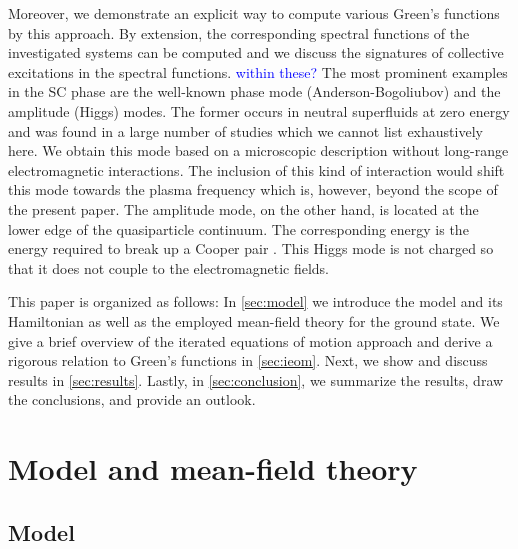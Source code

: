 \documentclass[
    reprint, 
    aps,
    preprintnumbers,
    twocolumn,
    prb,
    superscriptaddress
]{revtex4-2}
\newcommand{\blue}[1]{\textcolor{blue}{#1}}
\begin{document}
Moreover, we demonstrate an explicit way to compute various Green's functions by this approach.
By extension, the corresponding spectral functions of the investigated systems can be computed and 
we discuss the signatures of collective excitations in the spectral functions. \blue{within these?}
The most prominent examples in the SC phase are the well-known phase mode (Anderson-Bogoliubov) and 
the amplitude (Higgs) modes. The former occurs in neutral superfluids at zero energy and was found
in a large number of studies \cite{Bogoljubov1958,Anderson58,Brieskorn74,Schmid1975,simanek1975,schon76,Maiti2015,Sun2020,Fan22} which we cannot list exhaustively here.
We obtain this mode based on a microscopic description without long-range electromagnetic interactions.
The inclusion of this kind of interaction would shift this mode towards the plasma frequency 
\cite{Anderson58,schon76,Kulik1981} which is, however, beyond the scope of the present paper. 
The amplitude mode, on the other hand, is located at the lower edge of the quasiparticle continuum.
The corresponding energy is the energy required to break up a Cooper pair 
\cite{Schmid1975,Varma02,Cea14,Measson14,Tsuji15,Krull16,Mueller2019,Schwarz20}.
This Higgs mode is not charged so that it does not couple to the electromagnetic fields.

This paper is organized as follows:
In \autoref{sec:model} we introduce the model and its Hamiltonian as well as the employed mean-field theory for the ground state.
We give a brief overview of the iterated equations of motion approach and 
derive a rigorous relation to Green's functions in \autoref{sec:ieom}.
Next, we show and discuss results in \autoref{sec:results}.
Lastly, in \autoref{sec:conclusion}, we summarize the results, draw the conclusions, and provide
an outlook.

\section{Model and mean-field theory}\label{sec:model}

\subsection{Model}
\end{document}
